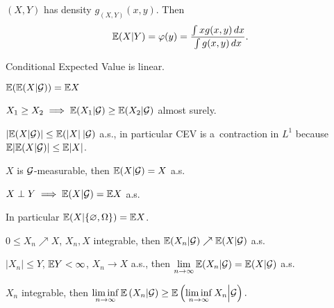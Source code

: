 



	\begin{example}
		$(X, Y)$ has density $g_{(X,Y)}(x,y)$.
		Then $$\mathbb{E}(X|Y) = \varphi(y) =
			\frac{\int x g(x,y)\,dx}{\int g(x,y)\,dx}.$$
	\end{example}
	
	\begin{proposition}
		Conditional Expected Value is linear.
	\end{proposition}
	
	\begin{proposition}
		$\mathbb{E}(\mathbb{E}(X | \mathcal{G})) = \mathbb{E} X$
	\end{proposition}
	
	\begin{proposition}
		$X_1 \geq X_2 \implies \mathbb{E}(X_1 | \mathcal{G}) \geq \mathbb{E}(X_2 | \mathcal{G})$ almost surely.
	\end{proposition}
	
	\begin{proposition}
		$|\mathbb{E}(X | \mathcal{G}) | \leq \mathbb{E}(|X|\: | \mathcal{G})$ a.s.,
		in particular CEV is a~contraction in $L^1$
		because $\mathbb{E}| \mathbb{E}(X | \mathcal{G}) | \leq \mathbb{E} |X|$.
	\end{proposition}

	
	\begin{proposition}
		$X$ is $\mathcal{G}$-measurable, then $\mathbb{E}(X|\mathcal{G}) = X$ a.s.
	\end{proposition}
	
	\begin{proposition}
		$X \perp Y \implies \mathbb{E}(X | \mathcal{G}) = \mathbb{E} X$ a.s.
		
		In particular $\mathbb{E}(X | \{ \varnothing, \Omega\}) = \mathbb{E} X$.
	\end{proposition}
	
	\begin{proposition}
		$0 \leq X_n \nearrow X$, $X_n, X$ integrable,
		then $\mathbb{E}(X_n | \mathcal{G}) \nearrow \mathbb{E}(X|\mathcal{G})$ a.s.
	\end{proposition}
	
	\begin{proposition}
		$|X_n| \leq Y$, $\mathbb{E} Y < \infty$, $X_n \to X$ a.s.,
		then $\displaystyle \lim_{n \to \infty} 
				\mathbb{E}(X_n | \mathcal{G}) = \mathbb{E}(X | \mathcal{G})$ a.s.
	\end{proposition}
	
	\begin{proposition}
		$X_n$ integrable, then $\displaystyle \liminf_{n \to \infty}
		\mathbb{E}\left(X_n | \mathcal{G}\right)
		\geq \mathbb{E}\left(\liminf_{n \to \infty} X_n \middle| \mathcal{G}\right).$
	\end{proposition}
	
